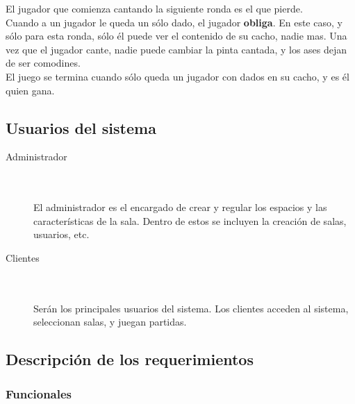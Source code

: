 \documentclass[a4paper,11pt]{article}
\begin{document}
	El jugador que comienza cantando la siguiente ronda es el que pierde.\\

	Cuando a un jugador le queda un sólo dado, el jugador \textbf{obliga}.
En este caso, y sólo para esta ronda, sólo él puede ver el contenido de su 
cacho, nadie mas. Una vez que el jugador cante, nadie puede cambiar la pinta
cantada, y los ases dejan de ser comodines.\\

	El juego se termina cuando sólo queda un jugador con dados en su cacho,
y es él quien gana.\\


\subsection{Usuarios del sistema}

\begin{description}
	\item[Administrador] \hfill \\ \\
	El administrador es el encargado de crear y 
	regular los espacios y las características de la sala. Dentro de estos
	se incluyen la creación de salas, usuarios, etc.

	\item[Clientes] \hfill \\ \\
	Serán los principales usuarios del sistema. Los 
	clientes acceden al sistema, seleccionan salas, y juegan partidas.
\end{description}
\newpage	

\subsection{Descripción de los requerimientos}
\subsubsection{Funcionales}
\end{document}
